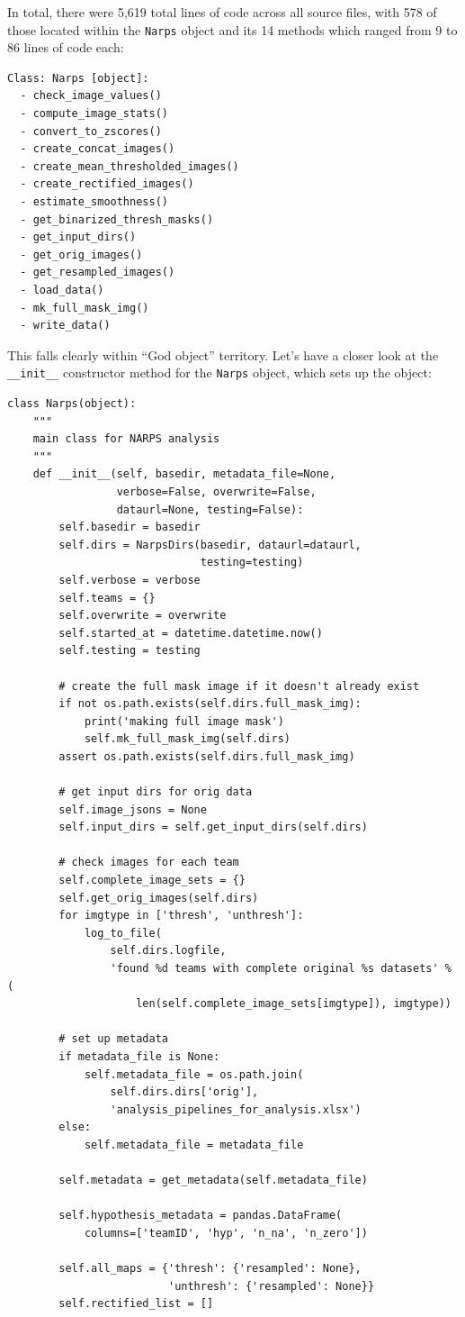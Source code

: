 In total, there were 5,619 total lines of code across all source files, with 578 of those located within the \texttt{Narps} object and its 14 methods which ranged from 9 to 86 lines of code each:

\begin{lstlisting}[style=shell]
Class: Narps [object]: 
  - check_image_values()
  - compute_image_stats()
  - convert_to_zscores()
  - create_concat_images()
  - create_mean_thresholded_images()
  - create_rectified_images()
  - estimate_smoothness()
  - get_binarized_thresh_masks()
  - get_input_dirs()
  - get_orig_images()
  - get_resampled_images()
  - load_data()
  - mk_full_mask_img()
  - write_data()
\end{lstlisting}

This falls clearly within ``God object'' territory.
Let's have a closer look at the \texttt{\_\_init\_\_} constructor method for the \texttt{Narps} object, which sets up the object:

\begin{lstlisting}[style=Python]
class Narps(object):
    """
    main class for NARPS analysis
    """
    def __init__(self, basedir, metadata_file=None,
                 verbose=False, overwrite=False,
                 dataurl=None, testing=False):
        self.basedir = basedir
        self.dirs = NarpsDirs(basedir, dataurl=dataurl,
                              testing=testing)
        self.verbose = verbose
        self.teams = {}
        self.overwrite = overwrite
        self.started_at = datetime.datetime.now()
        self.testing = testing

        # create the full mask image if it doesn't already exist
        if not os.path.exists(self.dirs.full_mask_img):
            print('making full image mask')
            self.mk_full_mask_img(self.dirs)
        assert os.path.exists(self.dirs.full_mask_img)

        # get input dirs for orig data
        self.image_jsons = None
        self.input_dirs = self.get_input_dirs(self.dirs)

        # check images for each team
        self.complete_image_sets = {}
        self.get_orig_images(self.dirs)
        for imgtype in ['thresh', 'unthresh']:
            log_to_file(
                self.dirs.logfile,
                'found %d teams with complete original %s datasets' % (
                    len(self.complete_image_sets[imgtype]), imgtype))

        # set up metadata
        if metadata_file is None:
            self.metadata_file = os.path.join(
                self.dirs.dirs['orig'],
                'analysis_pipelines_for_analysis.xlsx')
        else:
            self.metadata_file = metadata_file

        self.metadata = get_metadata(self.metadata_file)

        self.hypothesis_metadata = pandas.DataFrame(
            columns=['teamID', 'hyp', 'n_na', 'n_zero'])

        self.all_maps = {'thresh': {'resampled': None},
                         'unthresh': {'resampled': None}}
        self.rectified_list = []
\end{lstlisting}

